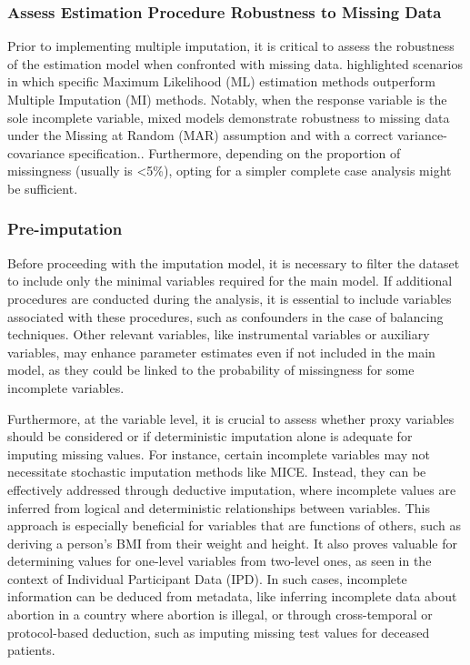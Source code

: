 \documentclass[
]{jss}
\begin{document}
\hypertarget{assess-estimation-procedure-robustness-to-missing-data}{%
\subsubsection{Assess Estimation Procedure Robustness to Missing
Data}\label{assess-estimation-procedure-robustness-to-missing-data}}

Prior to implementing multiple imputation, it is critical to assess the
robustness of the estimation model when confronted with missing data.
\cite{Alisson_2002} highlighted scenarios in which specific Maximum
Likelihood (ML) estimation methods outperform Multiple Imputation (MI)
methods. Notably, when the response variable is the sole incomplete
variable, mixed models demonstrate robustness to missing data under the
Missing at Random (MAR) assumption and with a correct
variance-covariance specification.\cite{Molenberghs_2007}. Furthermore,
depending on the proportion of missingness (usually is \textless5\%),
opting for a simpler complete case analysis might be sufficient.

\hypertarget{pre-imputation}{%
\subsubsection{Pre-imputation}\label{pre-imputation}}

Before proceeding with the imputation model, it is necessary to filter
the dataset to include only the minimal variables required for the main
model. If additional procedures are conducted during the analysis, it is
essential to include variables associated with these procedures, such as
confounders in the case of balancing techniques. Other relevant
variables, like instrumental variables or auxiliary variables, may
enhance parameter estimates even if not included in the main model, as
they could be linked to the probability of missingness for some
incomplete variables.

Furthermore, at the variable level, it is crucial to assess whether
proxy variables should be considered or if deterministic imputation
alone is adequate for imputing missing values. For instance, certain
incomplete variables may not necessitate stochastic imputation methods
like MICE. Instead, they can be effectively addressed through deductive
imputation, where incomplete values are inferred from logical and
deterministic relationships between variables. This approach is
especially beneficial for variables that are functions of others, such
as deriving a person's BMI from their weight and height. It also proves
valuable for determining values for one-level variables from two-level
ones, as seen in the context of Individual Participant Data (IPD). In
such cases, incomplete information can be deduced from metadata, like
inferring incomplete data about abortion in a country where abortion is
illegal, or through cross-temporal or protocol-based deduction, such as
imputing missing test values for deceased patients.
\end{document}
